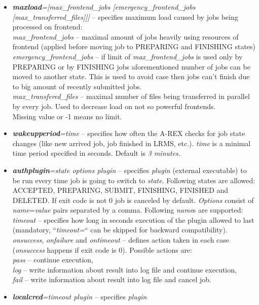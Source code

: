 \documentclass{article}                            %
\begin{document}
\begin{itemize}
\item \textbf{\textit{maxload}}\textit{={[}max\_frontend\_jobs {[}emergency\_frontend\_jobs
{[}max\_transferred\_files]]]} -- specifies maximum load caused by
jobs being processed on frontend:\\
\textit{max\_frontend\_jobs} -- maximal amount of jobs heavily using
resources of frontend (applied before moving job to PREPARING and
FINISHING states)\textit{}\\
\textit{emergency\_frontend\_jobs} -- if limit of \textit{max\_frontend\_jobs}
is used only by PREPARING or by FINISHING jobs aforementioned number
of jobs can be moved to another state. This is used to avoid case
then jobs can't finish due to big amount of recently submitted jobs.\textit{}\\
\textit{max\_transfered\_files} -- maximal number of files being transferred
in parallel by every job. Used to decrease load on not so powerful
frontends.\\
Missing value or -1 means no limit.
\item \textbf{\textit{wakeupperiod}}\textit{=time} -- specifies how often
the A-REX checks for job state changes (like new arrived job, job
finished in LRMS, etc.). \textit{time} is a minimal time period specified
in seconds. Default is \emph{3 minutes}.
\item \textbf{\textit{authplugin}}\textit{=state options plugin} -- specifies
\emph{plugin} (external executable) to be run every time job is going
to switch to \emph{state}. Following states are allowed: ACCEPTED,
PREPARING, SUBMIT, FINISHING, FINISHED and DELETED. If exit code is
not 0 job is canceled by default. \textit{Options} consist of \textit{name}=\textit{value}
pairs separated by a comma. Following \textit{name}s are supported:\\
\textit{timeout} -- specifies how long in seconds execution of the
plugin allowed to last (mandatory, {}``\textit{timeout=}{}`` can
be skipped for backward compatibility).\\
\textit{onsuccess}, \textit{onfailure} and \textit{ontimeout} -- defines
action taken in each case (\textit{onsuccess} happens if exit code
is 0). Possible actions are:\\
\textit{pass} -- continue execution,\\
\textit{log} -- write information about result into log file and continue
execution,\\
\textit{fail} -- write information about result into log file and cancel
job.
\item \textbf{\textit{localcred}}\textit{=timeout plugin} -- specifies \emph{plugin}

\end{itemize}
\end{document}

